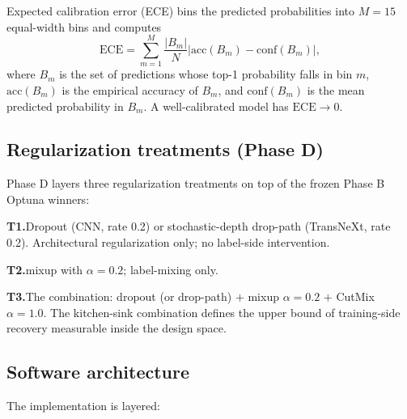 Expected calibration error (ECE) \cite{naeini2015ece, guo2017oncalibration}
bins the predicted probabilities into $M = 15$ equal-width bins and computes
\begin{equation}
  \mathrm{ECE} = \sum_{m=1}^{M} \frac{|B_m|}{N} \left| \mathrm{acc}(B_m) - \mathrm{conf}(B_m) \right|,
  \label{eq:ece}
\end{equation}
where $B_m$ is the set of predictions whose top-1 probability falls in bin
$m$, $\mathrm{acc}(B_m)$ is the empirical accuracy of $B_m$, and
$\mathrm{conf}(B_m)$ is the mean predicted probability in $B_m$. A
well-calibrated model has $\mathrm{ECE} \to 0$.

\subsection{Regularization treatments (Phase D)}
\label{sec:design:phase_d}

Phase D layers three regularization treatments on top of the frozen
Phase B Optuna winners:

\textbf{T1.}\quad Dropout (CNN, rate 0.2) or stochastic-depth drop-path
\cite{huang2016stochastic} (TransNeXt, rate 0.2). Architectural regularization
only; no label-side intervention.

\textbf{T2.}\quad mixup \cite{zhang2018mixup} with $\alpha = 0.2$;
label-mixing only.

\textbf{T3.}\quad The combination: dropout (or drop-path)
$+$ mixup $\alpha = 0.2$ $+$ CutMix \cite{yun2019cutmix} $\alpha = 1.0$.
The kitchen-sink combination defines the upper bound of training-side
recovery measurable inside the design space.

\subsection{Software architecture}
\label{sec:design:sw}

The implementation is layered:

